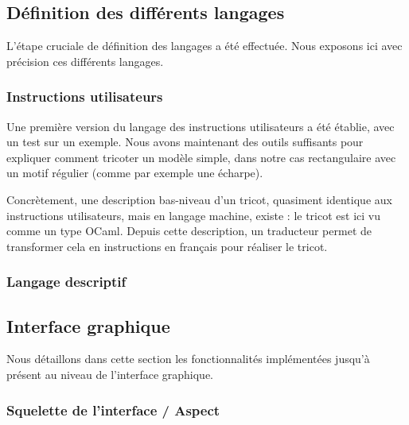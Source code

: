 \documentclass{article}
\begin{document}
\subsection{Définition des différents langages}

L'étape cruciale de définition des langages a été effectuée. Nous exposons ici avec précision ces différents langages.

\subsubsection{Instructions utilisateurs}

Une première version du langage des instructions utilisateurs a été établie, avec un test sur un exemple. Nous avons maintenant des outils 
suffisants pour expliquer comment tricoter un modèle simple, dans notre cas rectangulaire avec un motif régulier (comme par exemple une écharpe). 

Concrètement, une description bas-niveau d'un tricot, quasiment identique aux instructions utilisateurs, mais en langage machine, existe : le tricot 
est ici vu comme un type OCaml. Depuis cette description, un traducteur permet de transformer cela en instructions en français pour réaliser le tricot.

\subsubsection{Langage descriptif}

\subsection{Interface graphique}

Nous détaillons dans cette section les fonctionnalités implémentées jusqu'à présent au niveau de l'interface graphique.

\subsubsection{Squelette de l'interface / Aspect}
\end{document}
